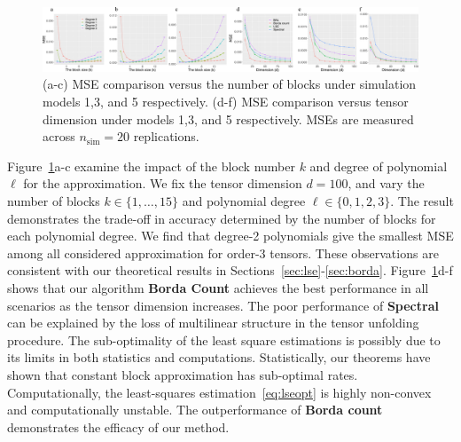 \documentclass{article}
\theoremstyle{definition}
\begin{document}

\vspace{-.3cm}
\begin{figure}[htp]
    \centering
    \includegraphics[width =\textwidth]{figures/sim2.pdf}    
    \caption{(a-c) MSE comparison versus the number of blocks under simulation models 1,3, and 5 respectively. (d-f) MSE comparison versus tensor dimension under models 1,3, and 5 respectively. MSEs are measured across $n_{\text{sim}} = 20$ replications.}
    \label{fig:degk}
    \vspace{-.3cm}
\end{figure}

Figure~\ref{fig:degk}a-c examine the impact of the block number $k$ and degree of polynomial $\ell$ for the approximation. We fix the tensor dimension $d = 100$, and vary the number of blocks $k\in\{1,\ldots,15\}$ and polynomial degree $\ell\in\{0,1,2,3\}.$ The result demonstrates the trade-off in accuracy determined by the number of blocks for each polynomial degree. We find that degree-2 polynomials give the smallest MSE among all considered approximation for order-3 tensors. These observations are consistent with our theoretical results in Sections~\ref{sec:lse}-\ref{sec:borda}. Figure~\ref{fig:degk}d-f shows that our algorithm {\bf \small Borda Count} achieves the best performance in all scenarios as the tensor dimension increases. The poor performance of {\bf \small Spectral} can be explained by the loss of multilinear structure in the tensor unfolding procedure. The sub-optimality of the least square estimations is possibly due to its limits in both statistics and computations. Statistically, our theorems have shown that constant block approximation has sub-optimal rates. Computationally, the least-squares estimation~\eqref{eq:lseopt} is highly non-convex and computationally unstable. The outperformance of {\bf \small Borda count} demonstrates the efficacy of our method.
\end{document}
